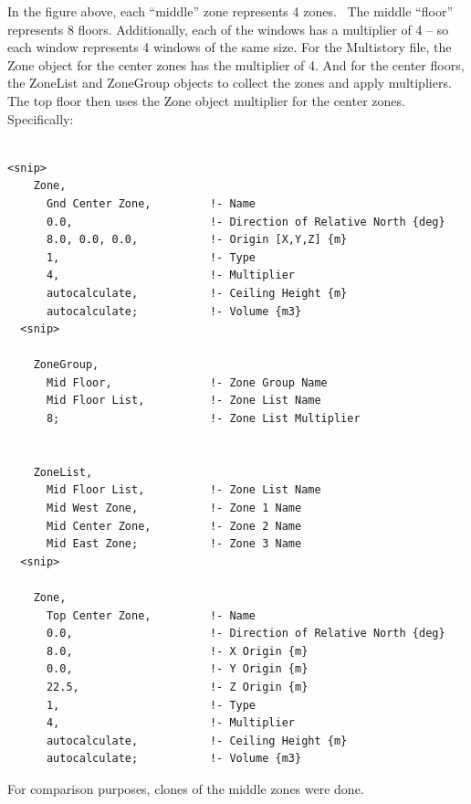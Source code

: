 In the figure above, each ``middle'' zone represents 4 zones.~ The middle ``floor'' represents 8 floors. Additionally, each of the windows has a multiplier of 4 -- so each window represents 4 windows of the same size. For the Multistory file, the Zone object for the center zones has the multiplier of 4. And for the center floors, the ZoneList and ZoneGroup objects to collect the zones and apply multipliers. The top floor then uses the Zone object multiplier for the center zones. Specifically:

\begin{lstlisting}

<snip>
    Zone,
      Gnd Center Zone,         !- Name
      0.0,                     !- Direction of Relative North {deg}
      8.0, 0.0, 0.0,           !- Origin [X,Y,Z] {m}
      1,                       !- Type
      4,                       !- Multiplier
      autocalculate,           !- Ceiling Height {m}
      autocalculate;           !- Volume {m3}
  <snip>

    ZoneGroup,
      Mid Floor,               !- Zone Group Name
      Mid Floor List,          !- Zone List Name
      8;                       !- Zone List Multiplier


    ZoneList,
      Mid Floor List,          !- Zone List Name
      Mid West Zone,           !- Zone 1 Name
      Mid Center Zone,         !- Zone 2 Name
      Mid East Zone;           !- Zone 3 Name
  <snip>

    Zone,
      Top Center Zone,         !- Name
      0.0,                     !- Direction of Relative North {deg}
      8.0,                     !- X Origin {m}
      0.0,                     !- Y Origin {m}
      22.5,                    !- Z Origin {m}
      1,                       !- Type
      4,                       !- Multiplier
      autocalculate,           !- Ceiling Height {m}
      autocalculate;           !- Volume {m3}
\end{lstlisting}

For comparison purposes, clones of the middle zones were done.

